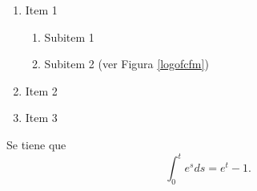 \begin{intro}
\lipsum[30-35]
\begin{enumerate}
	\item Item 1
	\begin{enumerate}
		\item Subitem 1
		\item Subitem 2 (ver Figura \ref{logofcfm})
	\end{enumerate}
	\item Item 2
	\item Item 3
\end{enumerate}
\begin{teo}
Se tiene que $$\int_0^t e^sds=e^t-1.$$
\end{teo}
\lipsum[36-40]
\end{intro}